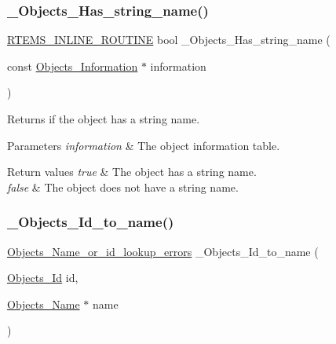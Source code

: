 \subsubsection{\texorpdfstring{\_Objects\_Has\_string\_name()}{\_Objects\_Has\_string\_name()}}
{\footnotesize\ttfamily \mbox{\hyperlink{group__RTEMSScoreBaseDefs_gac216239df231d5dbd15e3520b0b9313f}{R\+T\+E\+M\+S\+\_\+\+I\+N\+L\+I\+N\+E\+\_\+\+R\+O\+U\+T\+I\+NE}} bool \+\_\+\+Objects\+\_\+\+Has\+\_\+string\+\_\+name (\begin{DoxyParamCaption}\item[{const \mbox{\hyperlink{structObjects__Information}{Objects\+\_\+\+Information}} $\ast$}]{information }\end{DoxyParamCaption})}



Returns if the object has a string name. 


\begin{DoxyParams}{Parameters}
{\em information} & The object information table.\\
\hline
\end{DoxyParams}

\begin{DoxyRetVals}{Return values}
{\em true} & The object has a string name. \\
\hline
{\em false} & The object does not have a string name. \\
\hline
\end{DoxyRetVals}
\mbox{\label{group__RTEMSScoreObject_ga4ef83167e7503b64f503bd9218332cde}} 
\subsubsection{\texorpdfstring{\_Objects\_Id\_to\_name()}{\_Objects\_Id\_to\_name()}}
{\footnotesize\ttfamily \mbox{\hyperlink{group__RTEMSScoreObject_gaccfeec04954711c389b10aeccc91cabe}{Objects\+\_\+\+Name\+\_\+or\+\_\+id\+\_\+lookup\+\_\+errors}} \+\_\+\+Objects\+\_\+\+Id\+\_\+to\+\_\+name (\begin{DoxyParamCaption}\item[{\mbox{\hyperlink{group__RTEMSScoreObject_ga5821f52a51072941bdd603e542d0863e}{Objects\+\_\+\+Id}}}]{id,  }\item[{\mbox{\hyperlink{unionObjects__Name}{Objects\+\_\+\+Name}} $\ast$}]{name }\end{DoxyParamCaption})}



